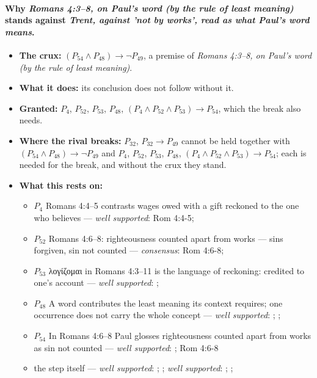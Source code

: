 \documentclass[11pt]{article}
\begin{document}
\paragraph{Why \emph{Romans 4:3–8, on Paul's word (by the rule of least meaning)} stands against \emph{Trent, against 'not by works', read as what Paul's word means}.}
\begin{itemize}
\item \textbf{The crux:} \((P_{54} \land P_{48}) \rightarrow \lnot P_{49}\), a premise of \emph{Romans 4:3–8, on Paul's word (by the rule of least meaning)}.
\item \textbf{What it does:} its conclusion does not follow without it.
\item \textbf{Granted:} \(P_{4}\), \(P_{52}\), \(P_{53}\), \(P_{48}\), \((P_{4} \land P_{52} \land P_{53}) \rightarrow P_{54}\), which the break also needs.
\item \textbf{Where the rival breaks:} \(P_{32}\), \(P_{32} \rightarrow P_{49}\) cannot be held together with \((P_{54} \land P_{48}) \rightarrow \lnot P_{49}\) and \(P_{4}\), \(P_{52}\), \(P_{53}\), \(P_{48}\), \((P_{4} \land P_{52} \land P_{53}) \rightarrow P_{54}\); each is needed for the break, and without the crux they stand.
\item \textbf{What this rests on:}
\begin{itemize}
\item \(P_{4}\) Romans 4:4–5 contrasts wages owed with a gift reckoned to the one who believes --- \emph{well supported}: Rom 4:4-5; \cite[III.xi.18]{calvin-institutes-1960}
\item \(P_{52}\) Romans 4:6–8: righteousness counted apart from works — sins forgiven, sin not counted --- \emph{consensus}: Rom 4:6-8; \cite[ad loc. Rom 4:6]{moo-romans-1996}
\item \(P_{53}\) λογίζομαι in Romans 4:3–11 is the language of reckoning: credited to one's account --- \emph{well supported}: \cite[s.v. λογίζομαι]{bauer-danker-lexicon-2000}; \cite[ad loc. Rom 4:3]{moo-romans-1996}
\item \(P_{48}\) A word contributes the least meaning its context requires; one occurrence does not carry the whole concept --- \emph{well supported}: \cite{silva-biblical-words-1994}; \cite{joos-semantic-axiom-1972}; \cite{barr-semantics-2004}
\item \(P_{54}\) In Romans 4:6–8 Paul glosses righteousness counted apart from works as sin not counted --- \emph{well supported}: \cite[ad loc. Rom 4:6]{moo-romans-1996}; Rom 4:6-8
\item the step itself --- \emph{well supported}: \cite[ad loc. Rom 4:6]{moo-romans-1996}; \cite[s.v. λογίζομαι]{bauer-danker-lexicon-2000}; \emph{well supported}: \cite{silva-biblical-words-1994}; \cite[p. 80]{moo-romans-1996}; \cite{barr-semantics-2004}
\end{itemize}
\end{itemize}
\end{document}
